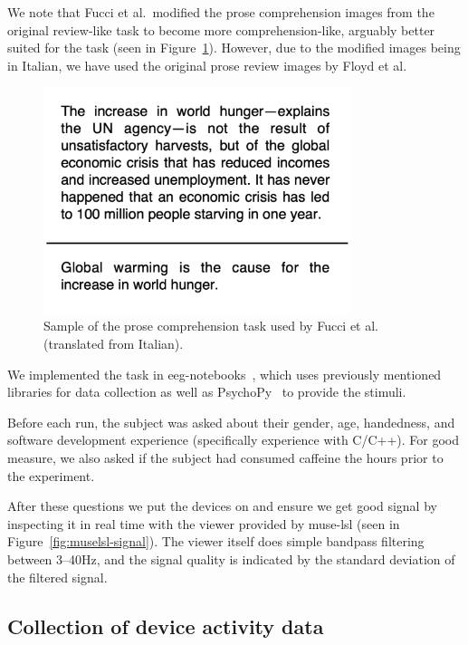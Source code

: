             We note that Fucci et al.~modified the prose comprehension images from the original review-like task to become more comprehension-like, arguably better suited for the task (seen in Figure~\ref{fig:prose-comp-fucci}). However, due to the modified images being in Italian, we have used the original prose review images by Floyd et al.

            \begin{figure}[H]
                \centering
                \includegraphics[width=90mm]{img/prose-comprehension.png}
                \caption{Sample of the prose comprehension task used by Fucci et al. (translated from Italian).}\label{fig:prose-comp-fucci}
            \end{figure}

            We implemented the task in eeg-notebooks~\cite{barachant_eeg-notebooks_2020}, which uses previously mentioned libraries for data collection as well as PsychoPy~\cite{peirce_psychopy2_2019} to provide the stimuli.

            Before each run, the subject was asked about their gender, age, handedness, and software development experience (specifically experience with C/C++). For good measure, we also asked if the subject had consumed caffeine the hours prior to the experiment.

            After these questions we put the devices on and ensure we get good signal by inspecting it in real time with the viewer provided by muse-lsl (seen in Figure~\ref{fig:muselsl-signal}). The viewer itself does simple bandpass filtering between 3--40Hz, and the signal quality is indicated by the standard deviation of the filtered signal.

    \subsection{Collection of device activity data}\label{section:collect-usage}

